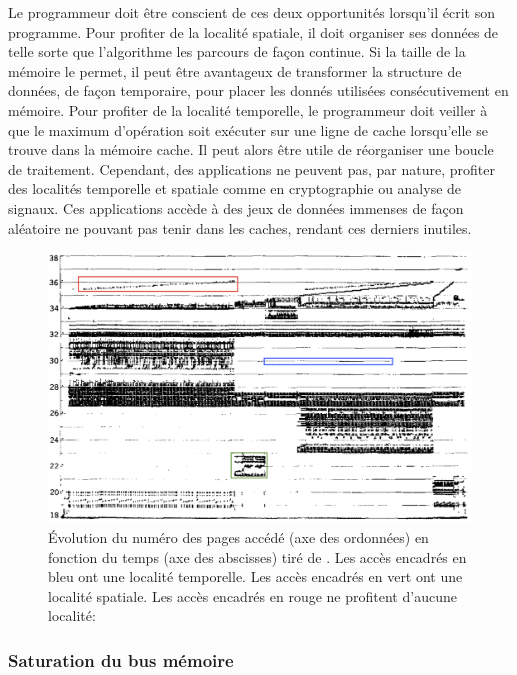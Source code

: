 Le programmeur doit être conscient de ces deux opportunités lorsqu'il écrit son programme. Pour profiter de la localité spatiale, il doit organiser ses données de telle sorte que l'algorithme les parcours de façon continue. Si la taille de la mémoire le permet, il peut être avantageux de transformer la structure de données, de façon temporaire, pour placer les donnés utilisées consécutivement en mémoire. Pour profiter de la localité temporelle, le programmeur doit veiller à que le maximum d'opération soit exécuter sur une ligne de cache lorsqu'elle se trouve dans la mémoire cache. Il peut alors être utile de réorganiser une boucle de traitement. Cependant, des applications ne peuvent pas, par nature, profiter des localités temporelle et spatiale comme en cryptographie ou analyse de signaux. Ces applications accède à des jeux de données immenses de façon aléatoire ne pouvant pas tenir dans les caches, rendant ces derniers inutiles.


\begin{figure}
    \center
    \includegraphics[width=14cm]{images/cpu_locality.png}
    \caption{ Évolution du numéro des pages accédé (axe des ordonnées) en fonction du temps (axe des abscisses) tiré de \cite{Hatfield:1971}. Les accès encadrés en bleu ont une localité temporelle. Les accès encadrés en vert ont une localité spatiale. Les accès encadrés en rouge ne profitent d'aucune localité: 
    \label{pic_cpu_locality}}
\end{figure}




\subsubsection{Saturation du bus mémoire}


